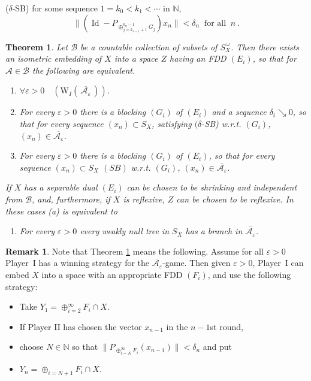 \documentclass[11pt,leqno]{amsart}
\newtheorem{thm}{Theorem}[section]
\theoremstyle{definition}
\newtheorem*{remark}{Remark}
\newcommand{\n}{\noindent}
\newcommand{\vp}{\varepsilon}
\newcommand{\Id}{\operatorname{Id}}
\newcommand{\cA}{\mathcal{A}}
\newcommand{\cB}{\mathcal{B}}
\newcommand{\bcAvp}{\overline{\mathcal{A_\vp}}}
\newcommand{\N}{\mathbb{N}}
\begin{document}
\n  ($\delta$-SB)\quad 
for some sequence $1= k_0<k_1<\cdots$ in $\N$, 
$$\|(\Id - P_{\oplus_{j=k_{n-1}+1}^{k_n-1} G_j }) x_n\| 
<\delta_n\ \text{ for all }\ n\ .$$

\begin{thm}\label{T1} 
Let $\cB$ be a countable collection of subsets of $S^{\,\omega}_X$.
Then there exists an isometric embedding of $X$ into a space $Z$ having an
FDD $(E_i)$, so that for $\cA\in\cB$ the following are equivalent.
\begin{enumerate}
\item[a)] $\forall\vp>0 \quad(\text{W}_I(\,\bcAvp\,))$.
\item[b)] For every $\vp>0$ there is a blocking  $(G_i)$ of $(E_i)$
and a sequence $\delta_i\searrow 0$, so that for
every sequence $(x_n)\subset S_X$, satisfying 
$(\delta$-SB) w.r.t. $(G_i)$, $(x_n)\in \bcAvp$.
\item[c)] For every $\vp>0$ there is a blocking  $(G_i)$ of $(E_i)$, so that for
every sequence $(x_n)\subset S_X$ 
$(SB)$ w.r.t. $(G_i)$, $(x_n)\in \bcAvp$.
\end{enumerate}
 
If $X$ has a separable dual $(E_i)$ can be chosen to be shrinking 
and independent from $\cB$, and, furthermore,  if $X$ is reflexive, 
$Z$ can be chosen to be reflexive.  
In these cases (a) is equivalent to 
\begin{enumerate}
\item[d)] 
For every $\vp>0$ every weakly null tree in $S_X$ has a branch in $\bcAvp$.
\end{enumerate}
\end{thm}

\begin{remark} 
Note that Theorem \ref{T1} means the following. 
Assume for all $\vp>0$ Player~I has a winning strategy for the $\bcAvp$-game. 
Then given $\vp>0$,
Player~I can embed $X$ into a space with  an appropriate FDD  
$(F_i)$, and  use the following strategy:
\begin{itemize}
\item[{}]  Take $Y_1=\oplus_{i=2}^\infty F_i\cap X$.
\item[{}]  If Player II has chosen the vector $x_{n-1}$ in the $n-1$st round,
\item[{}]  choose $N\in\N$ so that $\|P_{\oplus_{i=N}^\infty F_i} 
(x_{n-1})\|<\delta_n$ and put 
\item[{}]  $Y_n=\oplus_{i=N+1} F_i\cap X$. 
\end{itemize}
\end{remark}
\end{document}
